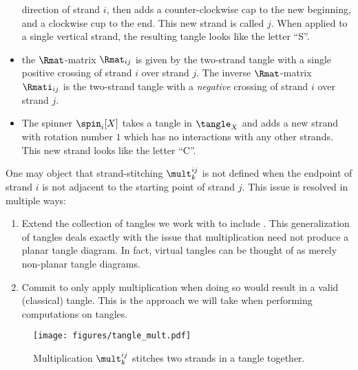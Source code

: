 \begin{theorem}
\begin{itemize}
                        direction of strand $i$, then adds a counter-clockwise
                        cap to the new beginning, and a clockwise cup to the
                        end. This new strand is called $j$. When applied to a
                        single vertical strand, the resulting tangle looks like
                        the letter \enquote{S}.
                \item the $\Rmat$-matrix $\Rmat_{ij}$ is given by the two-strand
                        tangle with a single positive crossing of strand $i$
                        over strand $j$. The inverse $\Rmat$-matrix
                        $\Rmati_{ij}$ is the two-strand tangle with a
                        \emph{negative} crossing of strand $i$ over strand $j$.
                \item The spinner $\spin_i[X]$ takes a tangle in $\tangle_X$ and
                        adds a new strand with rotation number $1$ which has no
                        interactions with any other strands. This new strand
                        looks like the letter \enquote{C}.
        \end{itemize}
\end{theorem}
\begin{remark}
        One may object that strand-stitching $\mult^{ij}_k$ is not defined when
        the endpoint of strand $i$ is not adjacent to the starting point of
        strand $j$. This issue is resolved in multiple ways:
        \begin{enumerate}
                \item Extend the collection of tangles we work with to include
                        . This generalization of tangles
                        deals exactly with the issue that multiplication need
                        not produce a planar tangle diagram. In fact, virtual
                        tangles can be thought of as merely non-planar tangle
                        diagrams.
                \item Commit to only apply multiplication when doing so would
                        result in a valid (classical) tangle. This is the
                        approach we will take when performing computations on
                        tangles.
        \end{enumerate}
\end{remark}
\begin{figure}[h]
        \centering
        \texttt{[image: figures/tangle\_mult.pdf]}
        \caption{
                Multiplication $\mult^{ij}_{k}$ stitches two strands in a tangle
                together.
        }
        \label{fig:tangle_mult}
\end{figure}
